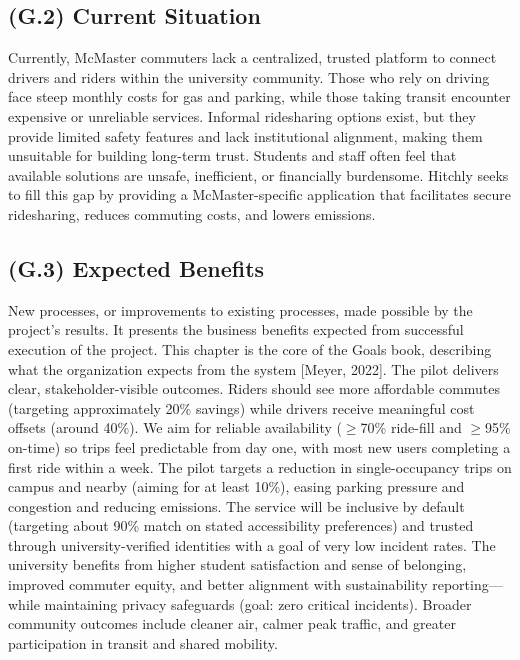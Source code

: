 \documentclass[12pt,letterpaper]{article}
\begin{document}
\subsection{(G.2) Current Situation}
\label{sec:goals2}

Currently, McMaster commuters lack a centralized, trusted platform to connect drivers and riders within the university community. Those who rely on driving face steep monthly costs for gas and parking, while those taking transit encounter expensive or unreliable services. Informal ridesharing options exist, but they provide limited safety features and lack institutional alignment, making them unsuitable for building long-term trust. Students and staff often feel that available solutions are unsafe, inefficient, or financially burdensome. Hitchly seeks to fill this gap by providing a McMaster-specific application that facilitates secure ridesharing, reduces commuting costs, and lowers emissions. 

\subsection{(G.3) Expected Benefits}
\label{sec:goals3}

New processes, or improvements to existing processes, made possible by the project's results. It presents the business benefits expected from successful execution of the project. This chapter is the core of the Goals book, describing what the organization expects from the system [Meyer, 2022].
The pilot delivers clear, stakeholder-visible outcomes. Riders should see more affordable commutes (targeting approximately 20\% savings) while drivers receive meaningful cost offsets (around 40\%). We aim for reliable availability ($\geq$70\% ride-fill and $\geq$95\% on-time) so trips feel predictable from day one, with most new users completing a first ride within a week. The pilot targets a reduction in single-occupancy trips on campus and nearby (aiming for at least 10\%), easing parking pressure and congestion and reducing emissions. The service will be inclusive by default (targeting about 90\% match on stated accessibility preferences) and trusted through university-verified identities with a goal of very low incident rates. The university benefits from higher student satisfaction and sense of belonging, improved commuter equity, and better alignment with sustainability reporting---while maintaining privacy safeguards (goal: zero critical incidents). Broader community outcomes include cleaner air, calmer peak traffic, and greater participation in transit and shared mobility.
\end{document}
